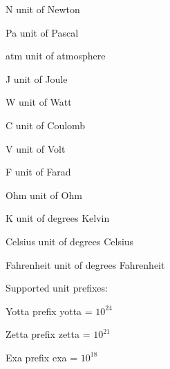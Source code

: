 \begin{datadesc}{N}
unit of Newton
\end{datadesc}

\begin{datadesc}{Pa}
unit of Pascal
\end{datadesc}

\begin{datadesc}{atm}
unit of atmosphere
\end{datadesc}

\begin{datadesc}{J}
unit of Joule
\end{datadesc}

\begin{datadesc}{W}
unit of Watt
\end{datadesc}

\begin{datadesc}{C}
unit of Coulomb
\end{datadesc}

\begin{datadesc}{V}
unit of Volt
\end{datadesc}

\begin{datadesc}{F}
unit of Farad
\end{datadesc}

\begin{datadesc}{Ohm}
unit of Ohm
\end{datadesc}

\begin{datadesc}{K}
unit of degrees Kelvin
\end{datadesc}

\begin{datadesc}{Celsius}
unit of degrees Celsius
\end{datadesc}

\begin{datadesc}{Fahrenheit}
unit of degrees Fahrenheit
\end{datadesc}

\noindent Supported unit prefixes:

\begin{datadesc}{Yotta}
prefix yotta = $10^{24}$
\end{datadesc}

\begin{datadesc}{Zetta}
prefix zetta = $10^{21}$
\end{datadesc}

\begin{datadesc}{Exa}
prefix exa = $10^{18}$
\end{datadesc}

